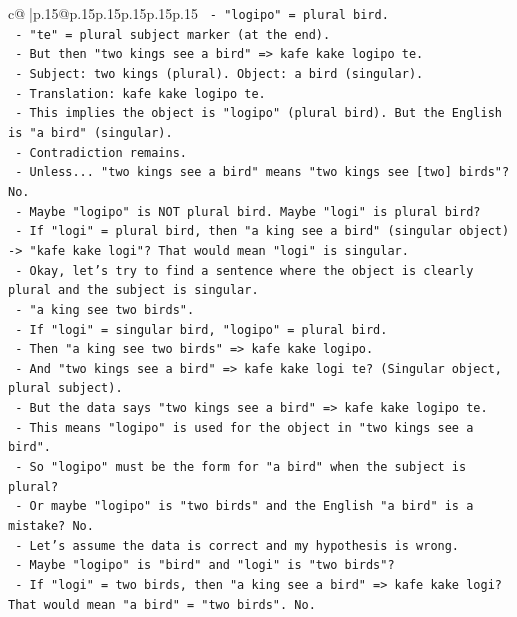 \documentclass{article}
\begin{document}
{\begin{supertabular}{c@{$\;$}|p{.15\linewidth}@{}p{.15\linewidth}p{.15\linewidth}p{.15\linewidth}p{.15\linewidth}p{.15\linewidth}}
{{{\texttt{    {-} "logipo" = plural bird.} \\
\texttt{    {-} "te" = plural subject marker (at the end).} \\
\texttt{  {-} But then "two kings see a bird" => kafe kake logipo te.} \\
\texttt{  {-} Subject: two kings (plural). Object: a bird (singular).} \\
\texttt{  {-} Translation: kafe kake logipo te.} \\
\texttt{  {-} This implies the object is "logipo" (plural bird). But the English is "a bird" (singular).} \\
\texttt{  {-} Contradiction remains.} \\
\texttt{  {-} Unless... "two kings see a bird" means "two kings see {[}two{]} birds"? No.} \\
\texttt{  {-} Maybe "logipo" is NOT plural bird. Maybe "logi" is plural bird?} \\
\texttt{  {-} If "logi" = plural bird, then "a king see a bird" (singular object) {-}> "kafe kake logi"? That would mean "logi" is singular.} \\
\texttt{  {-} Okay, let's try to find a sentence where the object is clearly plural and the subject is singular.} \\
\texttt{  {-} "a king see two birds".} \\
\texttt{  {-} If "logi" = singular bird, "logipo" = plural bird.} \\
\texttt{  {-} Then "a king see two birds" => kafe kake logipo.} \\
\texttt{  {-} And "two kings see a bird" => kafe kake logi te? (Singular object, plural subject).} \\
\texttt{  {-} But the data says "two kings see a bird" => kafe kake logipo te.} \\
\texttt{  {-} This means "logipo" is used for the object in "two kings see a bird".} \\
\texttt{  {-} So "logipo" must be the form for "a bird" when the subject is plural?} \\
\texttt{  {-} Or maybe "logipo" is "two birds" and the English "a bird" is a mistake? No.} \\
\texttt{  {-} Let's assume the data is correct and my hypothesis is wrong.} \\
\texttt{  {-} Maybe "logipo" is "bird" and "logi" is "two birds"?} \\
\texttt{  {-} If "logi" = two birds, then "a king see a bird" => kafe kake logi? That would mean "a bird" = "two birds". No.} \\
}}}
\end{supertabular}}
\end{document}
